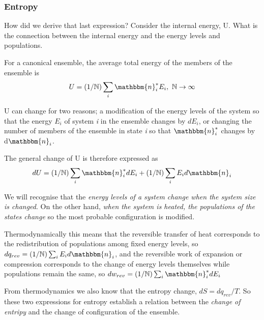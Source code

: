\documentclass[ignorenonframetext]{beamer}
\begin{document}
\begin{frame}
\frametitle{Entropy}

How did we derive that last expression? Consider the internal energy, U. What is the connection between the internal energy and the energy levels and populations. 

For a canonical ensemble, the average total energy of the members of the ensemble is
\[U = (1/\mathbb{N})\sum_i\mathbbm{n}_i^*E_i,\ \mathbb{N}\rightarrow\infty\]

U can change for two reasons; a modification of the energy levels of the system so that the energy  \(E_i\) of system \textit{i} in the ensemble changes by \(dE_i\), or changing the number of members of the ensemble in state \textit{i} so that \(\mathbbm{n}_i^*\) changes by d\(\mathbbm{n}_i\).

The general change of U is therefore expressed as 
\[dU = (1/\mathbb{N})\sum_i\mathbbm{n}_i^*dE_i+ (1/\mathbb{N})\sum_iE_id\mathbbm{n}_i\]

We will recognise that the \textit{energy levels of a system change when the system size is changed}. On the other hand, \textit{when the system is heated, the populations of the states change} so the most probable configuration is modified. 

Thermodynamically this means that the reversible transfer of heat corresponds to the redistribution of populations among fixed energy levels, so \(dq_{rev} = (1/\mathbb{N})\sum_iE_id\mathbbm{n}_i\), and the reversible work of expansion or compression corresponds to the change of energy levels themselves while populations remain the same, so \(dw_{rev} = (1/\mathbb{N})\sum_i\mathbbm{n}_i^*dE_i\)

From thermodynamics we also know that  the entropy change, \(dS = dq_{rev}/T\). So these two expressions for entropy establish a relation between the \textit{change of entripy} and the change of configuration of the ensemble.

\vspace{5pt}

\end{frame}
\end{document}
